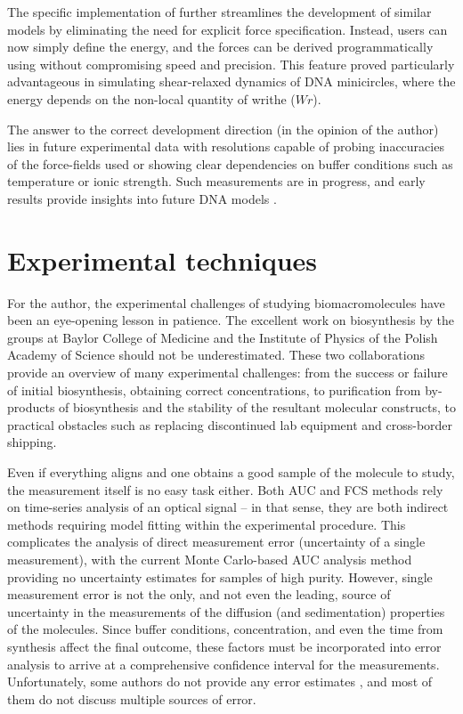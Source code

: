 \documentclass{doctoral}
\newcommand{\code}[1]{\texttt{\detokenize{#1}}}
\begin{document}
The specific implementation of \code{pychastic} further streamlines the development of similar models by eliminating the need for explicit force specification.
Instead, users can now simply define the energy, and the forces can be derived programmatically using \code{jax.grad} without compromising speed and precision.
This feature proved particularly advantageous in simulating shear-relaxed dynamics of DNA minicircles, where the energy depends on the non-local quantity of writhe ($Wr$).

The answer to the correct development direction (in the opinion of the author) lies in future experimental data with resolutions capable of probing inaccuracies of the force-fields used or showing clear dependencies on buffer conditions such as temperature or ionic strength.
Such measurements are in progress, and early results provide insights into future DNA models \cite{Ranasinghe_2023}.

\section{Experimental techniques}

For the author, the experimental challenges of studying biomacromolecules have been an eye-opening lesson in patience.
The excellent work on biosynthesis by the groups at Baylor College of Medicine and the Institute of Physics of the Polish Academy of Science should not be underestimated.
These two collaborations provide an overview of many experimental challenges: from the success or failure of initial biosynthesis, obtaining correct concentrations, to purification from by-products of biosynthesis and the stability of the resultant molecular constructs, to practical obstacles such as replacing discontinued lab equipment and cross-border shipping.

Even if everything aligns and one obtains a good sample of the molecule to study, the measurement itself is no easy task either.
Both AUC and FCS methods rely on time-series analysis of an optical signal -- in that sense, they are both indirect methods requiring model fitting within the experimental procedure.
This complicates the analysis of direct measurement error (uncertainty of a single measurement), with the current Monte Carlo-based AUC analysis method providing no uncertainty estimates for samples of high purity.
However, single measurement error is not the only, and not even the leading, source of uncertainty in the measurements of the diffusion (and sedimentation) properties of the molecules.
Since buffer conditions, concentration, and even the time from synthesis \cite{Nag_2011} affect the final outcome, these factors must be incorporated into error analysis to arrive at a comprehensive confidence interval for the measurements.
Unfortunately, some authors do not provide any error estimates \cite{Poznar_2017, Khaymina_2007}, and most of them do not discuss multiple sources of error.
\end{document}
